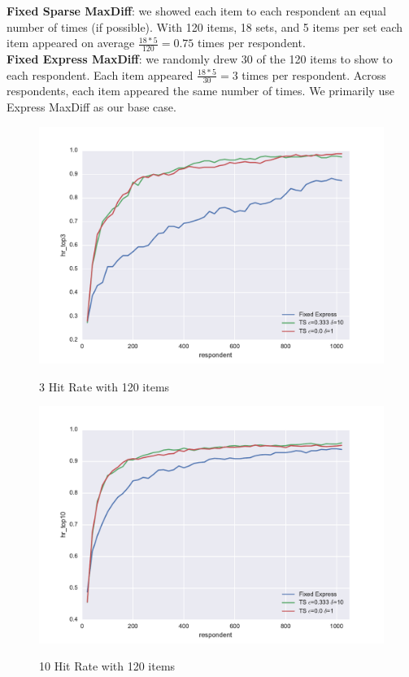 \documentclass[nonblindrev]{informs3}
\begin{document}
\textbf{Fixed Sparse MaxDiff}: we showed each item to each respondent an equal number of times (if possible).  With 120 items, 18 sets, and 5 items per set each item appeared on average $\frac{18*5}{120} = 0.75$ times per respondent. \\
\textbf{Fixed Express MaxDiff}: we randomly drew 30 of the 120 items to show to each respondent.  Each item appeared $\frac{18*5}{30} = 3$ times per respondent.  Across respondents, each item appeared the same number of times. We primarily use Express MaxDiff as our base case.\\

\begin{figure}
\caption{3 Hit Rate with 120 items}
\includegraphics[width=1\textwidth]{plots/3hitrate120show3.pdf}
\label{fig:3hit}
\end{figure}
\begin{figure}
\caption{10 Hit Rate with 120 items}
\includegraphics[width=1\textwidth]{plots/10hitrate120show3.pdf}
\label{fig:10hit}
\end{figure}
\end{document}
